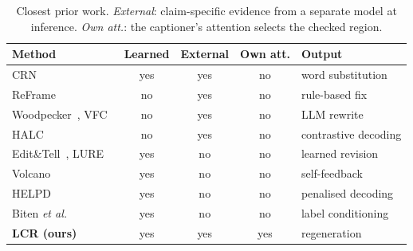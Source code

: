 \begin{table}[t]
\caption{Closest prior work. \emph{External}: claim-specific evidence from a separate model at inference. \emph{Own att.}: the captioner's attention selects the checked region.}
\label{tab:prior}
\centering
\footnotesize
\setlength{\tabcolsep}{3.5pt}
\begin{tabular}{@{}p{2.3cm}cccp{1.7cm}@{}}
\toprule
Method & Learned & External & Own att. & Output \\
\midrule
CRN~\cite{feng2020cascaded} & yes & yes & no & word substitution \\
ReFrame~\cite{adhikary2024reframe} & no & yes & no & rule-based fix \\
Woodpecker~\cite{yin2024woodpecker}, VFC~\cite{ge2024visual} & no & yes & no & LLM rewrite \\
HALC~\cite{chen2024halc} & no & yes & no & contrastive decoding \\
Edit\&Tell~\cite{sammani2020show}, LURE~\cite{zhou2024analyzing} & yes & no & no & learned revision \\
Volcano~\cite{lee2024volcano} & yes & no & no & self-feedback \\
HELPD~\cite{yuan2024helpd} & yes & no & no & penalised decoding \\
Biten \emph{et al.}~\cite{biten2022let} & yes & no & no & label conditioning \\
\textbf{LCR (ours)} & yes & yes & yes & regeneration \\
\bottomrule
\end{tabular}
\end{table}
